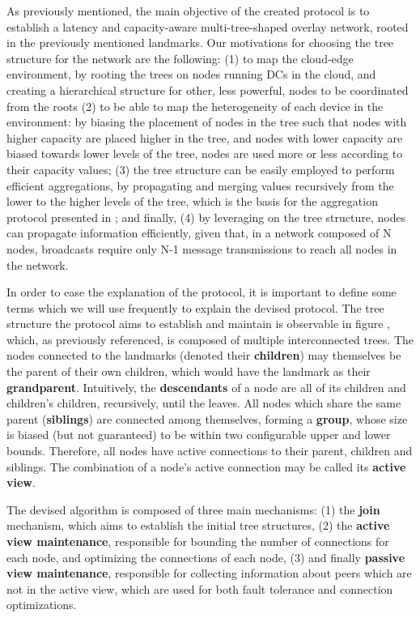 As previously mentioned, the main objective of the created protocol is to establish a latency and capacity-aware multi-tree-shaped overlay network, rooted in the previously mentioned landmarks. Our motivations for choosing the tree structure for the network are the following: (1) to map the cloud-edge environment, by rooting the trees on nodes running DCs in the cloud, and creating a hierarchical structure for other, less powerful, nodes to be coordinated from the roots  (2) to be able to map the heterogeneity of each device in the environment: by biasing the placement of nodes in the tree such that nodes with higher capacity are placed higher in the tree, and nodes with lower capacity are biased towards lower levels of the tree, nodes are used more or less according to their capacity values; (3) the tree structure can be easily employed to perform efficient aggregations, by propagating and merging values recursively from the lower to the higher levels of the tree, which is the basis for the aggregation protocol presented in ; and finally, (4) by leveraging on the tree structure, nodes can propagate information efficiently, given that, in a network composed of N nodes, broadcasts require only N-1 message transmissions to reach all nodes in the network. 

In order to ease the explanation of the protocol, it is important to define some terms which we will use frequently to explain the devised protocol. The tree structure the protocol aims to establish and maintain is observable in figure , which, as previously referenced, is composed of multiple interconnected trees. The nodes connected to the landmarks (denoted their \textbf{children}) may themselves be the parent of their own children, which would have the landmark as their \textbf{grandparent}. Intuitively, the \textbf{descendants} of a node are all of its children and children's children, recursively, until the leaves. All nodes which share the same parent (\textbf{siblings}) are connected among themselves, forming a \textbf{group}, whose size is biased (but not guaranteed) to be within two configurable upper and lower bounds. Therefore, all nodes have active connections to their parent, children and siblings. The combination of a node's active connection may be called its \textbf{active view}. 

The devised algorithm is composed of three main mechanisms: (1) the \textbf{join} mechanism, which aims to establish the initial tree structures, (2) the \textbf{active view maintenance}, responsible for bounding the number of connections for each node, and optimizing the connections of each node, (3)  and finally \textbf{passive view maintenance}, responsible for collecting information about peers which are not in the active view, which are used for both fault tolerance and connection optimizations.

